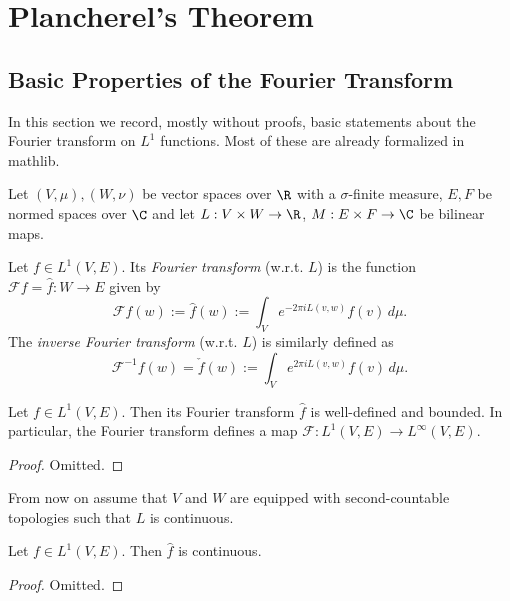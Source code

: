 \chapter{Plancherel's Theorem}
\label{chap:plancherel}
\section{Basic Properties of the Fourier Transform}
In this section we record, mostly without proofs, basic statements about the Fourier transform on
$L^1$ functions. Most of these are already formalized in mathlib.

Let $(V,\mu),(W,\nu)$ be vector spaces over $\R$ with a $\sigma$-finite measure,
$E,F$ be normed spaces over $\C$ and let $L:V\times W\to \R$, $M:E\times F\to\C$
be bilinear maps.
\begin{definition}
  \label{def:fourier-transform}
  \leanok
  Let $f\in L^1(V,E)$. Its \emph{Fourier transform} (w.r.t. $L$) is the function
  $\mathcal Ff=\widehat f:W\to E$ given by
  $$\mathcal Ff(w):=\widehat f(w):=\int_V e^{-2\pi i L(v,w)}f(v)\,d\mu.$$
  The \emph{inverse Fourier transform} (w.r.t. $L$) is similarly defined as
  $$\mathcal F^{-1}f(w)=\check f(w):=\int_Ve^{2\pi iL(v,w)}f(v)\,d\mu.$$
\end{definition}

\begin{lemma}
  \label{lem:fourier-bounded}
  \leanok
  Let $f\in L^1(V,E)$. Then its Fourier transform $\widehat f$ is well-defined and bounded.
  In particular, the Fourier transform defines a map $\mathcal F:L^1(V,E)\to L^\infty(V,E)$.
\end{lemma}
\begin{proof}
  \leanok
  Omitted.
\end{proof}

From now on assume that $V$ and $W$ are equipped with second-countable topologies such that
$L$ is continuous.
\begin{lemma}
  \label{lem:fourier-cont}
  \leanok
  Let $f\in L^1(V,E)$. Then $\widehat f$ is continuous.
\end{lemma}
\begin{proof}
  \leanok
  Omitted.
\end{proof}

